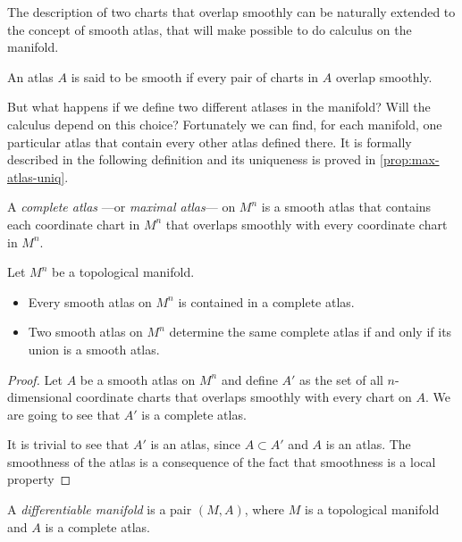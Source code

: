 The description of two charts that overlap smoothly can be naturally extended to the concept of smooth atlas, that will make possible to do calculus on the manifold.

\begin{definition}
    An atlas $A$ is said to be smooth if every pair of charts in $A$ overlap smoothly.
\end{definition}

But what happens if we define two different atlases in the manifold? Will the calculus depend on this choice? Fortunately we can find, for each manifold, one particular atlas that contain every other atlas defined there. It is formally described in the following definition and its uniqueness is proved in \autoref{prop:max-atlas-uniq}.

\begin{definition}
    A \emph{complete atlas} ---or \emph{maximal atlas}--- on $M^n$ is a smooth atlas that contains each coordinate chart in $M^n$ that overlaps smoothly with every coordinate chart in $M^n$.
\end{definition}

\begin{proposition}
    Let $M^n$ be a topological manifold.

    \begin{itemize}
        \item Every smooth atlas on $M^n$ is contained in a complete atlas.
        \item Two smooth atlas on $M^n$ determine the same complete atlas if and only if its union is a smooth atlas.
    \end{itemize}
    \label{prop:max-atlas-uniq}
\end{proposition}


\begin{proof}
 	Let $A$ be a smooth atlas on $M^n$ and define $A'$ as the set of all $n$-dimensional coordinate charts that overlaps smoothly with every chart on $A$. We are going to see that $A'$ is a complete atlas.
 	
 	It is trivial to see that $A'$ is an atlas, since $A \subset A'$ and $A$ is an atlas. The smoothness of the atlas is a consequence of the fact that smoothness is a local property 
\end{proof}

\begin{definition}
	A \emph{differentiable manifold} is a pair $(M, A)$, where $M$ is a topological manifold and $A$ is a complete atlas.
\end{definition}

